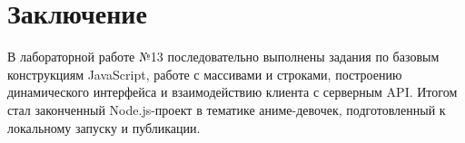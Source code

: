 \chapter*{Заключение}

В лабораторной работе №13 последовательно выполнены задания по базовым конструкциям JavaScript, работе с массивами и строками, построению динамического интерфейса и взаимодействию клиента с серверным API. Итогом стал законченный Node.js-проект в тематике аниме-девочек, подготовленный к локальному запуску и публикации.
